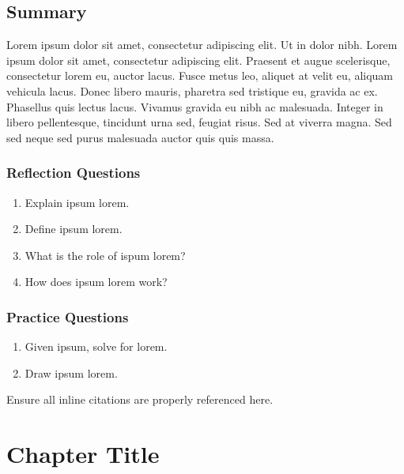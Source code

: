 \documentclass[
]{book}
\providecommand{\tightlist}{%
  \setlength{\itemsep}{0pt}\setlength{\parskip}{0pt}}
\begin{document}
\hypertarget{summary-2}{%
\section{Summary}\label{summary-2}}

Lorem ipsum dolor sit amet, consectetur adipiscing elit. Ut in dolor nibh. Lorem ipsum dolor sit amet, consectetur adipiscing elit. Praesent et augue scelerisque, consectetur lorem eu, auctor lacus. Fusce metus leo, aliquet at velit eu, aliquam vehicula lacus. Donec libero mauris, pharetra sed tristique eu, gravida ac ex. Phasellus quis lectus lacus. Vivamus gravida eu nibh ac malesuada. Integer in libero pellentesque, tincidunt urna sed, feugiat risus. Sed at viverra magna. Sed sed neque sed purus malesuada auctor quis quis massa.

\hypertarget{reflection-questions-1}{%
\subsection*{Reflection Questions}\label{reflection-questions-1}}

\begin{enumerate}
\def\labelenumi{\arabic{enumi}.}
\tightlist
\item
  Explain ipsum lorem.
\item
  Define ipsum lorem.
\item
  What is the role of ispum lorem?
\item
  How does ipsum lorem work?
\end{enumerate}

\hypertarget{practice-questions-1}{%
\subsection*{Practice Questions}\label{practice-questions-1}}

\begin{enumerate}
\def\labelenumi{\arabic{enumi}.}
\setcounter{enumi}{1}
\tightlist
\item
  Given ipsum, solve for lorem.
\item
  Draw ipsum lorem.
\end{enumerate}

Ensure all inline citations are properly referenced here.

\hypertarget{data-integration}{%
\chapter{Chapter Title}\label{data-integration}}
\end{document}
